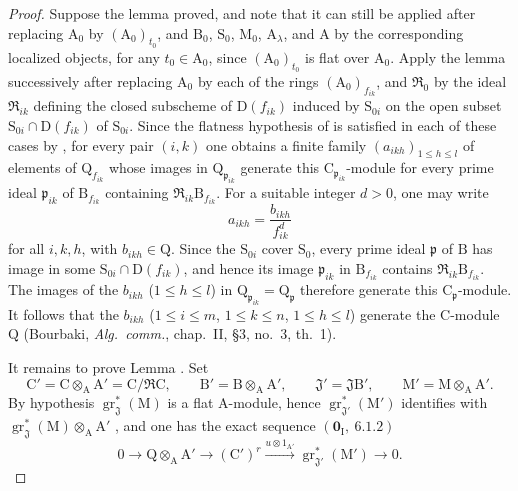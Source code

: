 \begin{proof}
Suppose the lemma proved, and note that it can still be applied after replacing $\mathrm{A}_0$ by $(\mathrm{A}_0)_{t_0}$, and $\mathrm{B}_0$, $\mathrm{S}_0$, $\mathrm{M}_0$, $\mathrm{A}_\lambda$, and $\mathrm{A}$ by the corresponding localized objects, for any $t_0\in\mathrm{A}_0$, since $(\mathrm{A}_0)_{t_0}$ is flat over $\mathrm{A}_0$. Apply the lemma successively after replacing $\mathrm{A}_0$ by each of the rings $(\mathrm{A}_0)_{f_{ik}}$, and $\mathfrak{R}_0$ by the ideal $\mathfrak{R}_{ik}$ defining the closed subscheme of $\mathrm{D}(f_{ik})$ induced by $\mathrm{S}_{0i}$ on the open subset $\mathrm{S}_{0i}\cap\mathrm{D}(f_{ik})$ of $\mathrm{S}_{0i}$. Since the flatness hypothesis of  is satisfied in each of these cases by , for every pair $(i,k)$ one obtains a finite family $(a_{ikh})_{1\leqslant h\leqslant l}$ of elements of $\mathrm{Q}_{f_{ik}}$ whose images in $\mathrm{Q}_{\mathfrak{p}_{ik}}$ generate this $\mathrm{C}_{\mathfrak{p}_{ik}}$-module for every prime ideal $\mathfrak{p}_{ik}$ of $\mathrm{B}_{f_{ik}}$ containing $\mathfrak{R}_{ik}\mathrm{B}_{f_{ik}}$. For a suitable integer $d>0$, one may write
\[
  a_{ikh}=\frac{b_{ikh}}{f_{ik}^{d}}
\]
for all $i,k,h$, with $b_{ikh}\in\mathrm{Q}$. Since the $\mathrm{S}_{0i}$ cover $\mathrm{S}_0$, every prime ideal $\mathfrak{p}$ of $\mathrm{B}$ has image in some $\mathrm{S}_{0i}\cap\mathrm{D}(f_{ik})$, and hence its image $\mathfrak{p}_{ik}$ in $\mathrm{B}_{f_{ik}}$ contains $\mathfrak{R}_{ik}\mathrm{B}_{f_{ik}}$. The images of the $b_{ikh}$ ($1\leqslant h\leqslant l$) in $\mathrm{Q}_{\mathfrak{p}_{ik}}=\mathrm{Q}_{\mathfrak{p}}$ therefore generate this $\mathrm{C}_{\mathfrak{p}}$-module. It follows that the $b_{ikh}$ ($1\leqslant i\leqslant m$, $1\leqslant k\leqslant n$, $1\leqslant h\leqslant l$) generate the $\mathrm{C}$-module $\mathrm{Q}$ (Bourbaki, \emph{Alg.\ comm.}, chap.~II, \S3, no.~3, th.~1).

It remains to prove Lemma . Set
\[
  \mathrm{C}'=\mathrm{C}\otimes_\mathrm{A}\mathrm{A}'=\mathrm{C}/\mathfrak{R}\mathrm{C},\qquad
  \mathrm{B}'=\mathrm{B}\otimes_\mathrm{A}\mathrm{A}',\qquad
  \mathfrak{J}'=\mathfrak{J}\mathrm{B}',\qquad
  \mathrm{M}'=\mathrm{M}\otimes_\mathrm{A}\mathrm{A}'.
\]
By hypothesis $\operatorname{gr}^*_\mathfrak{J}(\mathrm{M})$ is a flat $\mathrm{A}$-module, hence $\operatorname{gr}^*_{\mathfrak{J}'}(\mathrm{M}')$ identifies with $\operatorname{gr}^*_\mathfrak{J}(\mathrm{M})\otimes_\mathrm{A}\mathrm{A}'$ , and one has the exact sequence $(\mathbf{0}_\mathrm{I},~6.1.2)$
\begin{equation}
  0\longrightarrow\mathrm{Q}\otimes_\mathrm{A}\mathrm{A}'
  \longrightarrow(\mathrm{C}')^r
  \xrightarrow{u\otimes 1_{\mathrm{A}'}}
  \operatorname{gr}^*_{\mathfrak{J}'}(\mathrm{M}')
  \longrightarrow 0.
  \label{IV.11.2.9.7}
\tag{11.2.9.7}
\end{equation}


\end{proof}
